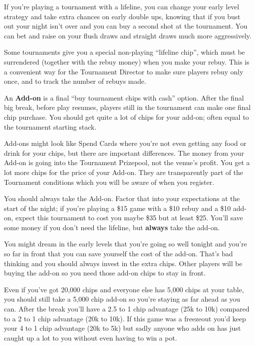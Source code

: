 If you're playing a tournament with a lifeline, you can change
your early level strategy and take extra chances on early
double ups, knowing that if you bust out your night isn't over and
you can buy a second shot at the tournament. You can bet and raise
on your flush draws and straight draws much more aggressively.

Some tournaments give you a special non-playing ``lifeline chip'',
which must be surrendered (together with the rebuy money) when you
make your rebuy. This is a convenient way for the Tournament
Director to make sure players rebuy only once, and to track the number
of rebuys made.

An \textbf{Add-on} is a final ``buy tournament chips with cash''
option. After the final big break, before play resumes, players still
in the tournament can make one final chip purchase. You should get
quite a lot of chips for your add-on; often equal to the tournament
starting stack.

Add-ons might look like Spend Cards where you're not even
getting any food or drink for your chips, but there are important
differences. The money from your Add-on is going into the Tournament
Prizepool, not the venue's profit. You get a lot more chips for
the price of your Add-on. They are transparently part of the
Tournament conditions which you will be aware of when you register.

You should always take the Add-on. Factor that into your expectations
at the start of the night; if you're playing a \$15 game with a \$10
rebuy and a \$10 add-on, expect this tournament to cost you maybe
\$35 but at least \$25. You'll save some money if you don't
need the lifeline, but \textbf{always} take the add-on.

You might dream in the early levels that you're going so well
tonight and you're so far in front that you can save yourself
the cost of the add-on. That's bad thinking and you should always
invest in the extra chips. Other players will be buying the add-on
so you need those add-on chips to stay in front.

Even if you've got 20,000 chips and everyone else has 5,000 chips at
your table, you should still take a 5,000 chip add-on so you're staying
as far ahead as you can. After the break you'll have a 2.5 to 1 chip
advantage (25k to 10k) compared to a 2 to 1 chip advantage (20k to 10k).
If this game was a freezeout you'd keep your 4 to 1 chip advantage
(20k to 5k) but sadly anyone who adds on has just caught up a lot to you
without even having to win a pot.

